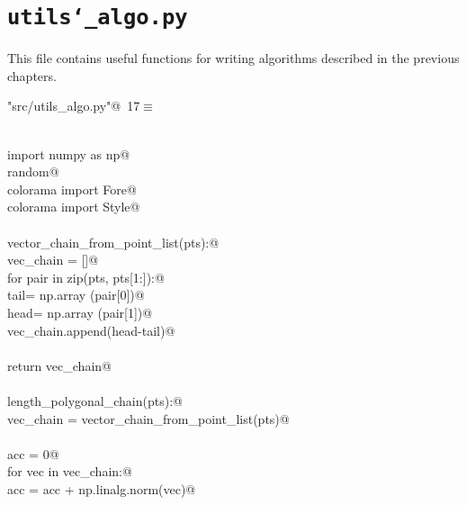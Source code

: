 \documentclass[12pt, english, oneside]{report}
\begin{document}
\begin{appendices}
\begin{flushleft}
\begin{list}{}{\setlength{\itemsep}{-\parsep}\setlength{\itemindent}{-\leftmargin}}
\item{}
\end{list}
\vspace{4ex}
\end{flushleft}

\newpage

\chapter{\texttt{utils\char`_algo.py}}

This file contains useful functions for writing algorithms described in the previous chapters.

\begin{flushleft} \small\label{scrap4}\raggedright\small
{} \verb@"src/utils_algo.py"@\nobreak\ {\footnotesize {17}}$\equiv$
\vspace{-1ex}
\begin{list}{}{} \item
\mbox{}\verb@@\\
\mbox{}\verb@ import numpy as np@\\
\mbox{}\verb@import random@\\
\mbox{}\verb@from colorama import Fore@\\
\mbox{}\verb@from colorama import Style@\\
\mbox{}\verb@@\\
\mbox{}\verb@def vector_chain_from_point_list(pts):@\\
\mbox{}\verb@    vec_chain = []@\\
\mbox{}\verb@    for pair in zip(pts, pts[1:]):@\\
\mbox{}\verb@        tail= np.array (pair[0])@\\
\mbox{}\verb@        head= np.array (pair[1])@\\
\mbox{}\verb@        vec_chain.append(head-tail)@\\
\mbox{}\verb@@\\
\mbox{}\verb@    return vec_chain@\\
\mbox{}\verb@@\\
\mbox{}\verb@def length_polygonal_chain(pts):@\\
\mbox{}\verb@    vec_chain = vector_chain_from_point_list(pts)@\\
\mbox{}\verb@@\\
\mbox{}\verb@    acc = 0@\\
\mbox{}\verb@    for vec in vec_chain:@\\
\mbox{}\verb@        acc = acc + np.linalg.norm(vec)@\\

\end{list}
\end{flushleft}
\end{appendices}
\end{document}
